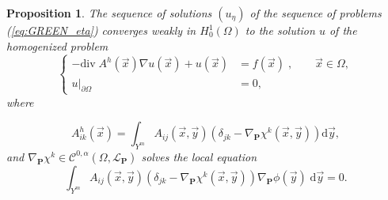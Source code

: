 \documentclass[a4paper,reqno]{amsart}
\numberwithin{equation}{section}
\numberwithin{equation}{section}		%
\numberwithin{figure}{section}			%
\numberwithin{table}{section}				%
\newtheorem{proposition}[theorem]{Proposition}
\theoremstyle{definition}
\newcommand{\<}{\ensuremath \leq}
\renewcommand{\>}{\ensuremath \geq}
\def\e{\eta}
\def\O{\Omega}
\begin{document}
\begin{proposition}\label{maintheorem_Homogenized_spectrum}
The sequence of solutions  $(u_\e)$ of the sequence of problems (\ref{eq:GREEN_eta}) converges weakly in $H^1_0(\Omega)$  to the solution $u$ of the homogenized problem
 \begin{equation}  \label{eq:homogenized_static_strong}
     \left\{
        \begin{aligned}
   -  \mathrm{div} \;  A^h(\vec{x})  \nabla  u(\vec{x})
   + u(\vec{x})
   & =    f (\vec{x})  \;, \qquad \vec{x} \in \Omega,\\
            u|_{\partial\Omega} & = 0,
        \end{aligned}
        \right.
\end{equation}
where

\begin{equation}  \label{eq:homogenized_sigma_static}
     A^h_{ik}(\vec{x}) =   \int_{Y^m} A_{ij}\left(\vec{x},\vec{y} \right) \left( \delta_{jk} -  \nabla_{\textbf{P}}\chi^k (\vec{x},\vec{y})\right) \mathrm{d}\vec{y},
\end{equation}
and $\nabla_{\textbf{P}}\chi^k \in \mathcal{C}^{0,\alpha}(\O,{\mathcal L}_\textbf{P})$
solves the local equation
\begin{equation}\label{eq:local_static}
    \int_{Y^m} A_{ij}\left(\vec{x},\vec{y} \right) \left( \delta_{jk} -  \nabla_{\textbf{P}}\chi^k (\vec{x},\vec{y})\right)  \nabla_\textbf{P} \phi(\vec{y}) \; \mathrm{d}\vec{y}=0.
\end{equation}
\end{proposition}
\end{document}
